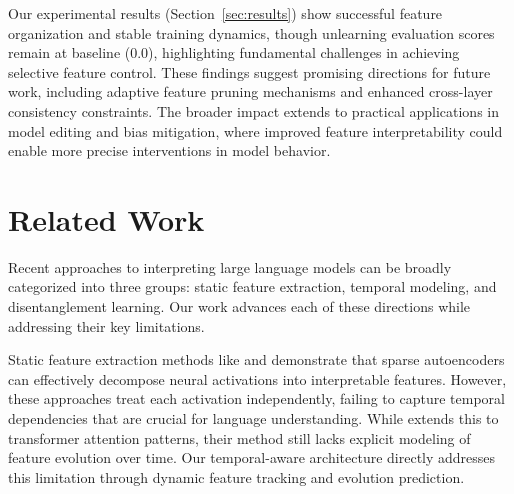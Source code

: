\documentclass{article} %
\begin{document}
Our experimental results (Section~\ref{sec:results}) show successful feature organization and stable training dynamics, though unlearning evaluation scores remain at baseline (0.0), highlighting fundamental challenges in achieving selective feature control. These findings suggest promising directions for future work, including adaptive feature pruning mechanisms and enhanced cross-layer consistency constraints. The broader impact extends to practical applications in model editing and bias mitigation, where improved feature interpretability could enable more precise interventions in model behavior.

\section{Related Work}
\label{sec:related}
% 
%
%
%
%

Recent approaches to interpreting large language models can be broadly categorized into three groups: static feature extraction, temporal modeling, and disentanglement learning. Our work advances each of these directions while addressing their key limitations.

Static feature extraction methods like \cite{Cunningham2023SparseAF} and \cite{Makelov2024TowardsPE} demonstrate that sparse autoencoders can effectively decompose neural activations into interpretable features. However, these approaches treat each activation independently, failing to capture temporal dependencies that are crucial for language understanding. While \cite{Kissane2024InterpretingAL} extends this to transformer attention patterns, their method still lacks explicit modeling of feature evolution over time. Our temporal-aware architecture directly addresses this limitation through dynamic feature tracking and evolution prediction.
\end{document}
